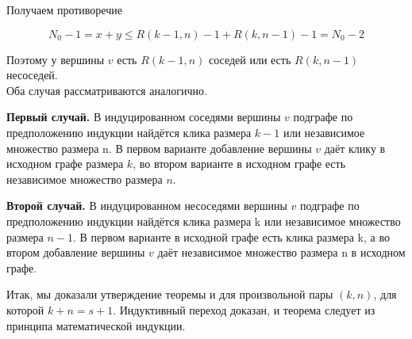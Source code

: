 Получаем противоречие

$$N_0 - 1 = x + y \leq R(k - 1, n) - 1 + R(k, n - 1) - 1 = N_0 - 2$$

Поэтому у вершины $v$ есть $R(k - 1, n)$ соседей или есть $R(k, n - 1)$ несоседей. \\

Оба случая рассматриваются аналогично.

\textbf{Первый случай.} В индуцированном соседями вершины $v$ подграфе по предположению индукции найдётся клика размера $k - 1$ или независимое множество размера n. В первом варианте добавление вершины $v$ даёт клику в исходном графе размера $k$, во втором варианте в исходном графе есть независимое множество размера $n$.

\textbf{Второй случай.} В индуцированном несоседями вершины $v$ подграфе по предположению индукции найдётся клика размера k или независимое множество размера $n - 1$. В первом варианте в исходной графе есть клика размера k, а во втором добавление вершины $v$ даёт независимое множество размера n в исходном графе.

Итак, мы доказали утверждение теоремы и для произвольной пары $(k, n)$, для которой $k + n = s + 1$. Индуктивный переход доказан, и теорема следует из принципа математической индукции.
